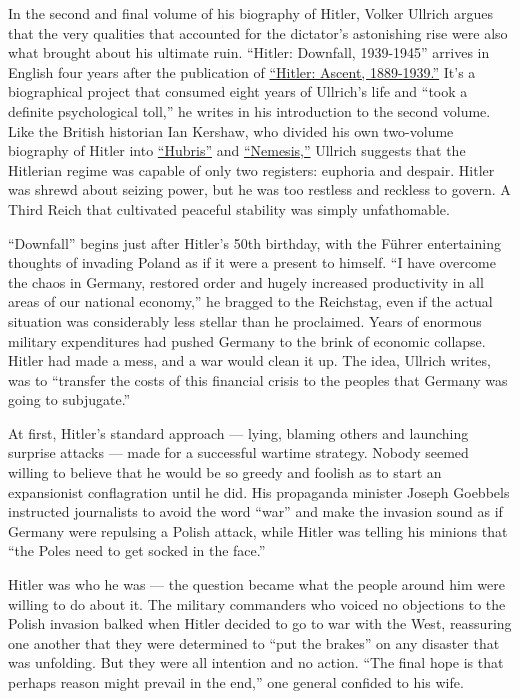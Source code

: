 In the second and final volume of his biography of Hitler, Volker
Ullrich argues that the very qualities that accounted for the dictator's
astonishing rise were also what brought about his ultimate ruin.
``Hitler: Downfall, 1939-1945'' arrives in English four years after the
publication of
\href{https://www.nytimes3xbfgragh.onion/2016/09/28/books/hitler-ascent-volker-ullrich.html}{``Hitler:
Ascent, 1889-1939.''} It's a biographical project that consumed eight
years of Ullrich's life and ``took a definite psychological toll,'' he
writes in his introduction to the second volume. Like the British
historian Ian Kershaw, who divided his own two-volume biography of
Hitler into
\href{https://archive.nytimes3xbfgragh.onion/www.nytimes3xbfgragh.onion/books/99/01/31/reviews/990131.31reich3t.html}{``Hubris''}
and
\href{https://archive.nytimes3xbfgragh.onion/www.nytimes3xbfgragh.onion/books/00/12/10/reviews/001210.10bur.html}{``Nemesis,''}
Ullrich suggests that the Hitlerian regime was capable of only two
registers: euphoria and despair. Hitler was shrewd about seizing power,
but he was too restless and reckless to govern. A Third Reich that
cultivated peaceful stability was simply unfathomable.

``Downfall'' begins just after Hitler's 50th birthday, with the Führer
entertaining thoughts of invading Poland as if it were a present to
himself. ``I have overcome the chaos in Germany, restored order and
hugely increased productivity in all areas of our national economy,'' he
bragged to the Reichstag, even if the actual situation was considerably
less stellar than he proclaimed. Years of enormous military expenditures
had pushed Germany to the brink of economic collapse. Hitler had made a
mess, and a war would clean it up. The idea, Ullrich writes, was to
``transfer the costs of this financial crisis to the peoples that
Germany was going to subjugate.''

At first, Hitler's standard approach --- lying, blaming others and
launching surprise attacks --- made for a successful wartime strategy.
Nobody seemed willing to believe that he would be so greedy and foolish
as to start an expansionist conflagration until he did. His propaganda
minister Joseph Goebbels instructed journalists to avoid the word
``war'' and make the invasion sound as if Germany were repulsing a
Polish attack, while Hitler was telling his minions that ``the Poles
need to get socked in the face.''

Hitler was who he was --- the question became what the people around him
were willing to do about it. The military commanders who voiced no
objections to the Polish invasion balked when Hitler decided to go to
war with the West, reassuring one another that they were determined to
``put the brakes'' on any disaster that was unfolding. But they were all
intention and no action. ``The final hope is that perhaps reason might
prevail in the end,'' one general confided to his wife.

